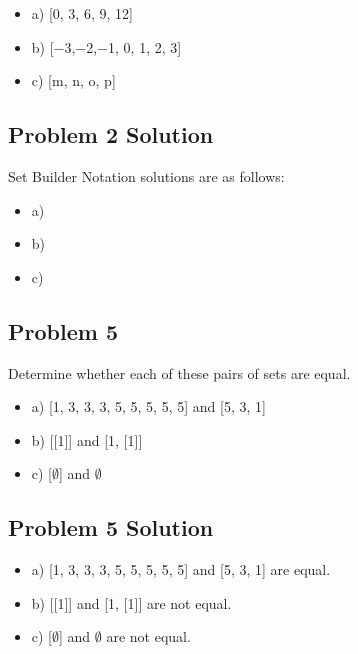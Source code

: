 \documentclass[11pt]{article}
\begin{document}
\begin{itemize}
\item a) [0, 3, 6, 9, 12] \\
\item b) [−3,−2,−1, 0, 1, 2, 3] \\
\item c) [m, n, o, p] \\
\end{itemize}

\subsection{Problem 2 Solution}

Set Builder Notation solutions are as follows:

\begin{itemize}
\item a) \\
\item b) \\
\item c) \\
\end{itemize}

\subsection{Problem 5}

Determine whether each of these pairs of sets are equal.

\begin{itemize}
\item a) [1, 3, 3, 3, 5, 5, 5, 5, 5] and [5, 3, 1] \\
\item b) [[1]] and [1, [1]] \\
\item c) [$\emptyset$] and $\emptyset$ \\
\end{itemize}

\subsection{Problem 5 Solution}

\begin{itemize}
\item a) [1, 3, 3, 3, 5, 5, 5, 5, 5] and [5, 3, 1] are equal. \\
\item b) [[1]] and [1, [1]] are not equal. \\
\item c) [$\emptyset$] and $\emptyset$ are not equal. \\
\end{itemize}
\end{document}
